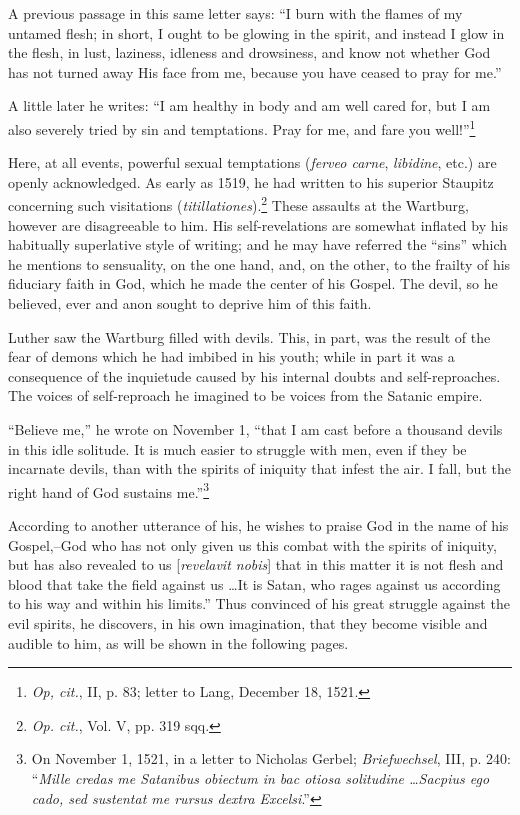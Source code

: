 A previous passage in this same letter says: “I burn with the flames of
my untamed flesh; in short, I ought to be glowing in the spirit, and instead
I glow in the flesh, in lust, laziness, idleness and drowsiness, and know not
whether God has not turned away His face from me, because you have
ceased to pray for me.”

A little later he writes: “I am healthy in body and am well cared for, but
I am also severely tried by sin and temptations. Pray for me, and fare you
well!”\footnote{\textit{Op, cit.}, II, p. 83; letter to Lang, December 18, 1521.}

Here, at all events, powerful sexual temptations (\textit{ferveo carne},
\textit{libidine}, etc.) are openly acknowledged. As early as 1519, he had
written to his superior Staupitz concerning such visitations (\textit{titillationes}).\footnote
{\textit{Op. cit.}, Vol. V, pp. 319 sqq.}
These assaults at the Wartburg, however are disagreeable
to him. His self-revelations are somewhat inflated by his habitually
superlative style of writing; and he may have referred the “sins”
which he mentions to sensuality, on the one hand, and, on the other,
to the frailty of his fiduciary faith in God, which he made the center
of his Gospel. The devil, so he believed, ever and anon sought to deprive
him of this faith.

Luther saw the Wartburg filled with devils. This, in part, was the
result of the fear of demons which he had imbibed in his youth; while
in part it was a consequence of the inquietude caused by his internal
doubts and self-reproaches. The voices of self-reproach he imagined
to be voices from the Satanic empire.

“Believe me,” he wrote on November 1, “that I am cast before a thousand
devils in this idle solitude. It is much easier to struggle with men, even if
they be incarnate devils, than with the spirits of iniquity that infest the air.
I fall, but the right hand of God sustains me.”\footnote
{On November 1, 1521, in a letter to Nicholas Gerbel; \textit{Briefwechsel}, III, p. 240: ``\textit{Mille
credas me Satanibus obiectum in bac otiosa solitudine \dots Sacpius ego cado, sed sustentat
me rursus dextra Excelsi}.”}

According to another utterance of his, he wishes to praise God in the
name of his Gospel,--God who has not only given us this combat with the
spirits of iniquity, but has also revealed to us [\textit{revelavit nobis}] that in this
matter it is not flesh and blood that take the field against us \dots It is
Satan, who rages against us according to his way and within his limits.”
Thus convinced of his great struggle against the evil spirits, he discovers,
in his own imagination, that they become visible and audible to him, as
will be shown in the following pages.

